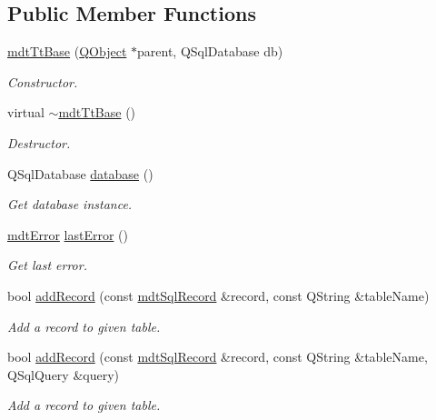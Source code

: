\subsection*{Public Member Functions}
\begin{DoxyCompactItemize}
\item 
\hyperlink{classmdt_tt_base_a6dbd221d1518e30c3692a7ba54b57c03}{mdt\-Tt\-Base} (\hyperlink{class_q_object}{Q\-Object} $\ast$parent, Q\-Sql\-Database db)
\begin{DoxyCompactList}\small\item\em Constructor. \end{DoxyCompactList}\item 
virtual \hyperlink{classmdt_tt_base_ab5081719f8d49a8d6547240c5cc01699}{$\sim$mdt\-Tt\-Base} ()
\begin{DoxyCompactList}\small\item\em Destructor. \end{DoxyCompactList}\item 
Q\-Sql\-Database \hyperlink{classmdt_tt_base_a82c3f795b6cb8101b12e0e0ef340c1be}{database} ()
\begin{DoxyCompactList}\small\item\em Get database instance. \end{DoxyCompactList}\item 
\hyperlink{classmdt_error}{mdt\-Error} \hyperlink{classmdt_tt_base_a92adaae105cef63b18ace2e320776ca9}{last\-Error} ()
\begin{DoxyCompactList}\small\item\em Get last error. \end{DoxyCompactList}\item 
bool \hyperlink{classmdt_tt_base_a4ca4fb3600aad6a8f279abd37fc1a4d7}{add\-Record} (const \hyperlink{classmdt_sql_record}{mdt\-Sql\-Record} \&record, const Q\-String \&table\-Name)
\begin{DoxyCompactList}\small\item\em Add a record to given table. \end{DoxyCompactList}\item 
bool \hyperlink{classmdt_tt_base_a1dc2f8748c7b1b86569868ac9a092b2d}{add\-Record} (const \hyperlink{classmdt_sql_record}{mdt\-Sql\-Record} \&record, const Q\-String \&table\-Name, Q\-Sql\-Query \&query)
\begin{DoxyCompactList}\small\item\em Add a record to given table. \end{DoxyCompactList}\item 

\end{DoxyCompactItemize}
